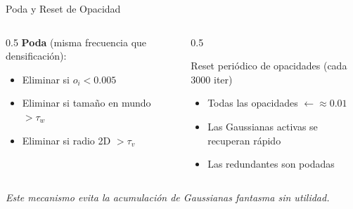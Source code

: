 \begin{frame}{Poda y Reset de Opacidad}
  \begin{columns}
    \begin{column}{0.5\textwidth}
      \textbf{Poda} (misma frecuencia que densificación):
      \vspace{0.3em}
      \begin{itemize}
        \item Eliminar si $o_i < 0.005$
        \item Eliminar si tamaño en mundo $> \tau_w$
        \item Eliminar si radio 2D $> \tau_v$
      \end{itemize}
    \end{column}
    \begin{column}{0.5\textwidth}
      \begin{alertblock}{Reset periódico de opacidades (cada 3000 iter)}
        \begin{itemize}
          \item Todas las opacidades $\leftarrow \approx 0.01$
          \item Las Gaussianas activas se recuperan rápido
          \item Las redundantes son podadas
        \end{itemize}
      \end{alertblock}
    \end{column}
  \end{columns}
  \vspace{0.5em}
  \centering
  \textit{Este mecanismo evita la acumulación de Gaussianas fantasma sin utilidad.}
\end{frame}
